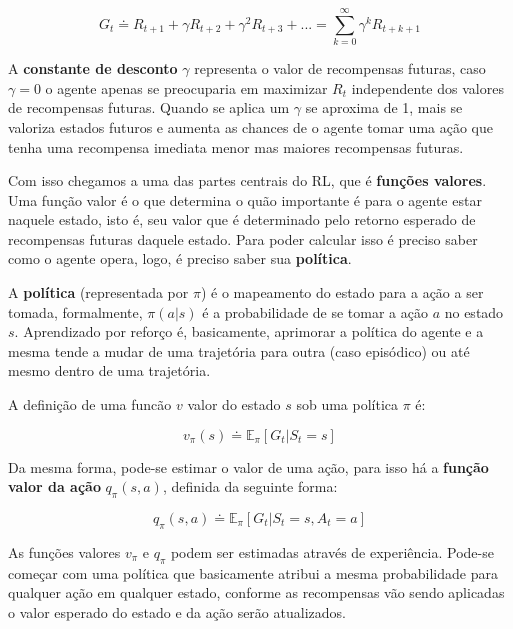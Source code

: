 \begin{equation}
   G_t \doteq R_{t+1} + \gamma R_{t+2} + \gamma^{2} R_{t+3} + ... = \sum_{k = 0}^{\infty}\gamma^{k}R_{t+k+1}
\end{equation}

A \textbf{constante de desconto} $\gamma$ representa o valor de recompensas futuras, caso $\gamma = 0$ o agente apenas se preocuparia em maximizar $R_t$ independente dos valores de recompensas futuras. Quando se aplica um $\gamma$ se aproxima de 1, mais se valoriza estados futuros e aumenta as chances de o agente tomar uma ação que tenha uma recompensa imediata menor mas maiores recompensas futuras. 

Com isso chegamos a uma das partes centrais do RL, que é \textbf{funções valores}. Uma função valor é o que determina o quão importante é para o agente estar naquele estado, isto é, seu valor que é determinado pelo retorno esperado de recompensas futuras daquele estado. Para poder calcular isso é preciso saber como o agente opera, logo, é preciso saber sua \textbf{política}.

A \textbf{política} (representada por $\pi$) é o mapeamento do estado para a ação a ser tomada, formalmente, $\pi(a|s)$ é a probabilidade de se tomar a ação $a$ no estado $s$. Aprendizado por reforço é, basicamente, aprimorar a política do agente e a mesma tende a mudar de uma trajetória para outra (caso episódico) ou até mesmo dentro de uma trajetória.

A definição de uma funcão $v$ valor do estado $s$ sob uma política $\pi$ é:

\begin{equation} \label{state-value-function}
   v_\pi(s) \doteq \mathbb{E}_\pi[G_t|S_t=s]
\end{equation}

Da mesma forma, pode-se estimar o valor de uma ação, para isso há a \textbf{função valor da ação} $q_\pi(s,a)$, definida da seguinte forma:

\begin{equation} \label{action-value-function}
   q_\pi(s,a) \doteq \mathbb{E}_\pi[G_t|S_t=s,A_t=a]
\end{equation}

As funções valores $v_\pi$ e $q_\pi$ podem ser estimadas através de experiência. Pode-se começar com uma política que basicamente atribui a mesma probabilidade para qualquer ação em qualquer estado, conforme as recompensas vão sendo aplicadas o valor esperado do estado e da ação serão atualizados.

